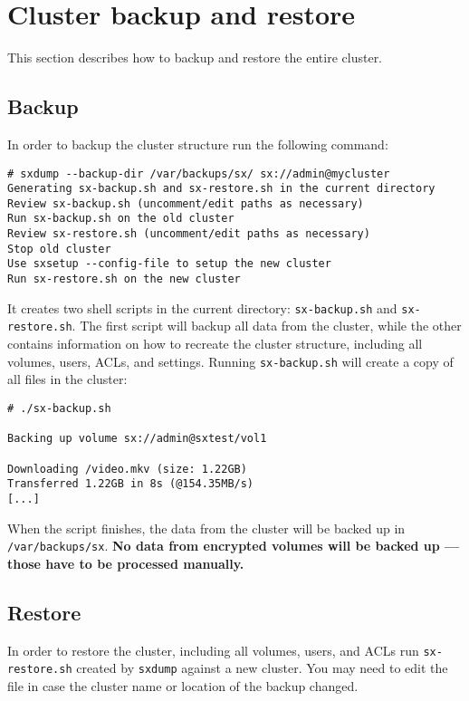 \section{Cluster backup and restore}
This section describes how to backup and restore the entire cluster.

\subsection{Backup}
In order to backup the cluster structure run the following command:
\begin{lstlisting}
# sxdump --backup-dir /var/backups/sx/ sx://admin@mycluster
Generating sx-backup.sh and sx-restore.sh in the current directory
Review sx-backup.sh (uncomment/edit paths as necessary)
Run sx-backup.sh on the old cluster
Review sx-restore.sh (uncomment/edit paths as necessary)
Stop old cluster
Use sxsetup --config-file to setup the new cluster
Run sx-restore.sh on the new cluster
\end{lstlisting}
It creates two shell scripts in the current directory: \verb+sx-backup.sh+ and
\verb+sx-restore.sh+. The first script will backup all data from the cluster,
while the other contains information on how to recreate the cluster structure,
including all volumes, users, ACLs, and settings. Running
\verb+sx-backup.sh+ will create a copy of all files in the cluster:
\begin{lstlisting}
# ./sx-backup.sh

Backing up volume sx://admin@sxtest/vol1

Downloading /video.mkv (size: 1.22GB)
Transferred 1.22GB in 8s (@154.35MB/s)           
[...]
\end{lstlisting}
When the script finishes, the data from the cluster will be backed up
in \verb+/var/backups/sx+. \textbf{No data from encrypted volumes will be
backed up --- those have to be processed manually.}

\subsection{Restore}
In order to restore the cluster, including all volumes, users, and ACLs run
\verb+sx-restore.sh+ created by \verb+sxdump+ against a new cluster. You may
need to edit the file in case the cluster name or location of the backup changed.

